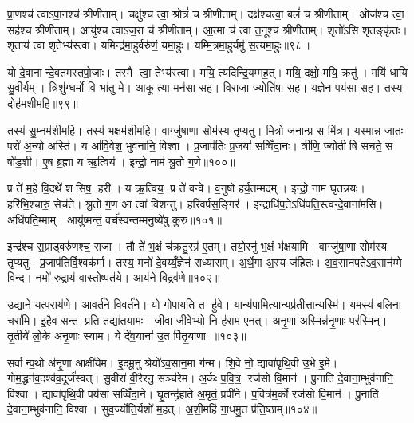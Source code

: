 प्रा॒णश्च॑ त्वाऽपा॒नश्च॑ श्रीणीताम्। चक्षु॑श्च त्वा॒ श्रोत्रं॑ च श्रीणीताम्। दक्ष॑श्चत्वा॒ बलं॑ च श्रीणीताम्। ओज॑श्च त्वा॒ सह॑श्च श्रीणीताम्। आयु॑श्च त्वाऽज॒रा च॑ श्रीणीताम्। आ॒त्मा च॑ त्वा त॒नूश्च॑ श्रीणीताम्। शृ॒तो॑ऽसि शृ॒तङ्कृ॑तः। शृ॒ताय॑ त्वा शृ॒तेभ्य॑स्त्वा। यमिन्द्र॑मा॒हुर्वरु॑णं॒ यमा॒हुः। यम्मि॒त्रमा॒हुर्यमु॑ स॒त्यमा॒हुः॥९८॥

यो दे॒वानान्दे॒वत॑मस्तपो॒जाः। तस्मै त्वा॒ तेभ्य॑स्त्वा। मयि॒ त्यदि॑न्द्रि॒यम्मह॒त्। मयि॒ दक्षो॒ मयि॒ क्रतु॑। मयि॑ धायि सु॒वीर्यम्। त्रिशु॑ग्घ॒र्मो वि भा॑तु मे। आकूत्या॒ मन॑सा स॒ह। वि॒राजा॒ ज्योति॑षा स॒ह। य॒ज्ञेन॒ पय॑सा स॒ह। तस्य॒ दोह॑मशीमहि॥९९॥

तस्य॑ सु॒म्नम॑शीमहि। तस्य॑ भ॒क्षम॑शीमहि। वाग्जु॑षा॒णा सोम॑स्य तृप्यतु। मि॒त्रो जना॒न्प्र स मि॑त्र। यस्मा॒न्न जा॒तः परो॑ अ॒न्यो अस्ति॑। य आ॑वि॒वेश॒ भुव॑नानि॒ विश्वा। प्र॒जाप॑तिः प्र॒जया॑ सव्विँदा॒नः। त्रीणि॒ ज्योतीषि सचते॒ स षो॑ड॒शी। ए॒ष ब्र॒ह्मा य ऋ॒त्विय॑। इन्द्रो॒ नाम॑ श्रु॒तो ग॒णे॥१००॥

प्र ते॑ म॒हे वि॒दथे॑ शसिष॒ हरी। य ऋ॒त्विय॒ प्र ते॑ वन्वे। व॒नुषो॑ हर्य॒तम्मदम्। इन्द्रो॒ नाम॑ घृ॒तन्नयः। हरि॑भि॒श्चारु॒ सेच॑ते। श्रु॒तो ग॒ण आ त्वा॑ विशन्तु। हरि॑वर्पस॒ङ्गिर॑। इन्द्राधि॑प॒तेऽधि॑पति॒स्त्वन्दे॒वाना॑मसि। अधि॑पति॒म्माम्। आयु॑ष्मन्तं॒ वर्च॑स्वन्तम्मनु॒ष्ये॑षु कुरु॥१०१॥

इन्द्र॑श्च स॒म्राड्वरु॑णश्च॒ राजा। तौ ते॑ भ॒क्षं च॑क्रतु॒रग्र॑ ए॒तम्। तयो॒रनु॑ भ॒क्षं भ॑क्षयामि। वाग्जु॑षा॒णा सोम॑स्य तृप्यतु। प्र॒जाप॑तिर्वि॒श्वक॑र्मा। तस्य॒ मनो॑ दे॒वय्यँ॒ज्ञेन॑ राध्यासम्। अ॒र्थे॒गा अ॒स्य ज॑हितः। अ॒व॒सान॑पतेऽव॒सान॑म्मे विन्द। नमो॑ रु॒द्राय॑ वास्तो॒ष्पत॑ये। आय॑ने वि॒द्रव॑णे॥१०२॥

उ॒द्याने॒ यत्प॒राय॑णे। आ॒वर्त॑ने वि॒वर्त॑ने। यो गो॑पा॒यति॒ त हु॑वे। यान्य॑पा॒मित्या॒न्यप्र॑तीत्ता॒न्यस्मि॑। य॒मस्य॑ ब॒लिना॒ चरा॑मि। इ॒हैव सन्त॒ प्रति॒ तद्या॑तयामः। जी॒वा जी॒वेभ्यो॒ नि ह॑राम एनत्। अ॒नृ॒णा अ॒स्मिन्न॑नृ॒णाः पर॑स्मिन्। तृ॒तीये॑ लो॒के अ॑नृ॒णाः स्या॑म। ये दे॑व॒याना॑ उ॒त पि॑तृ॒याणा॥१०३॥

सर्वान्प॒थो अ॑नृ॒णा आक्षी॑येम। इ॒दमू॒नु श्रेयो॑ऽव॒सान॒मा ग॑न्म। शि॒वे नो॒ द्यावा॑पृथि॒वी उ॒भे इ॒मे। गोम॒द्धन॑व॒दश्व॑व॒दूर्ज॑स्वत्। सु॒वीरा॑ वी॒रैरनु॒ सञ्च॑रेम। अ॒र्कः प॒वि॒त्र॒ रज॑सो वि॒मान॑। पु॒नाति॑ दे॒वाना॒म्भुव॑नानि॒ विश्वा। द्यावा॑पृथि॒वी पय॑सा सव्विँदा॒ने। घृ॒तन्दु॑हाते अ॒मृतं॒ प्रपी॑ने। प॒वित्र॑म॒र्को रज॑सो वि॒मान॑। पु॒नाति॑ दे॒वाना॒म्भुव॑नानि॒ विश्वा। सुव॒र्ज्योति॒र्यशो॑ म॒हत्। अ॒शी॒महि॑ गा॒धमु॒त प्र॑ति॒ष्ठाम्॥१०४॥\anuvakamend[चा॒त॒य॒त॒ श्री॒णी॒ता॒ स॒त्यमा॒हुर॑शीमहि ग॒णे कु॑रु वि॒द्रव॑णे पितृ॒याणा॑ अ॒र्को रज॑सो वि॒मान॒स्त्रीणि॑ च]

